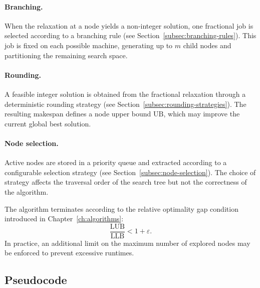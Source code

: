 \paragraph{Branching.}
When the relaxation at a node yields a non-integer solution, one fractional job is selected according to a branching rule (see Section~\ref{subsec:branching-rules}).
This job is fixed on each possible machine, generating up to \(m\) child nodes and partitioning the remaining search space.

\paragraph{Rounding.}
A feasible integer solution is obtained from the fractional relaxation through a deterministic rounding strategy (see Section~\ref{subsec:rounding-strategies}).
The resulting makespan defines a node upper bound \(\text{UB}\), which may improve the current global best solution.

\paragraph{Node selection.}
Active nodes are stored in a priority queue and extracted according to a configurable selection strategy (see Section~\ref{subsec:node-selection}).
The choice of strategy affects the traversal order of the search tree but not the correctness of the algorithm.

\medskip
The algorithm terminates according to the relative optimality gap condition introduced in Chapter~\ref{ch:algorithms}:
\[
  \frac{\text{LUB}}{\text{LLB}} < 1 + \varepsilon.
\]
In practice, an additional limit on the maximum number of explored nodes may be enforced to prevent excessive runtimes.

\subsection{Pseudocode}

